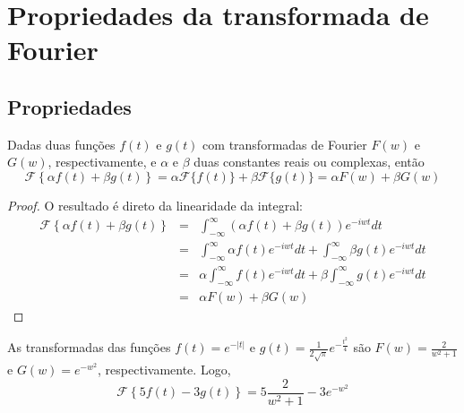 %
\chapter{Propriedades da transformada de Fourier}


\section{Propriedades}
\begin{propr}\label{prop_linear}
Dadas duas funções $f(t)$ e $g(t)$ com transformadas de Fourier $F(w)$ e $G(w)$, respectivamente, e $\alpha$ e $\beta$ duas constantes reais ou complexas, então
$$
\mathcal{F}\left\{\alpha f(t)+\beta g(t)\right\}=\alpha \mathcal{F}\{ f(t)\}+\beta\mathcal{F}\{ g(t)\}=\alpha F(w)+\beta G(w)
$$
\end{propr}
\begin{proof}
O resultado é direto da linearidade da integral:
\begin{eqnarray*}
\mathcal{F}\left\{\alpha f(t)+\beta g(t)\right\}&=&\int_{-\infty}^\infty \left(\alpha f(t)+\beta g(t)\right) e^{-iwt}dt \\
&=&\int_{-\infty}^\infty \alpha f(t)e^{-iwt}dt+\int_{-\infty}^\infty \beta g(t) e^{-iwt}dt \\
&=&\alpha\int_{-\infty}^\infty  f(t)e^{-iwt}dt+\beta\int_{-\infty}^\infty  g(t) e^{-iwt}dt \\
&=&\alpha F(w)+\beta G(w)
\end{eqnarray*}
\end{proof}
\begin{ex}As transformadas das funções $f(t)=e^{-|t|}$ e $g(t)=\frac{1}{2\sqrt{\pi}}e^{-\frac{t^2}{4}}$ são $F(w)=\frac{2}{w^2+1}$ e $G(w)=e^{-w^2}$, respectivamente. Logo,
$$
\mathcal{F}\left\{5 f(t)-3 g(t)\right\}=5 \frac{2}{w^2+1}-3e^{-w^2}
$$
\end{ex}

